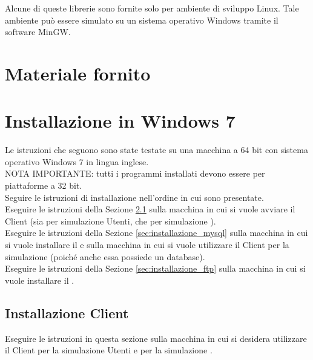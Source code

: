\documentclass[a4paper,twoside,10pt,openany]{scrbook}
\begin{document}
Alcune di queste librerie sono fornite solo per ambiente di sviluppo Linux. Tale ambiente può essere simulato su un sistema operativo Windows tramite il software MinGW.\\
%
%
\section{Materiale fornito}
%
\section{Installazione in Windows 7}
%
Le istruzioni che seguono sono state testate su una macchina a 64 bit con sistema operativo Windows 7 in lingua inglese.\\
NOTA IMPORTANTE: tutti i programmi installati devono essere per piattaforme a 32 bit.\\
Seguire le istruzioni di installazione nell'ordine in cui sono presentate.\\
Eseguire le istruzioni della Sezione \ref{sec:installazione_client} sulla macchina in cui si vuole avviare il Client (sia per simulazione Utenti, che per simulazione \auth).\\
Eseguire le istruzioni della Sezione \ref{sec:installazione_mysql} sulla macchina in cui si vuole installare il \sr e sulla macchina in cui si vuole utilizzare il Client per la simulazione \auth (poiché anche essa possiede un database).\\
Eseguire le istruzioni della Sezione \ref{sec:installazione_ftp} sulla macchina in cui si vuole installare il \sa.\\
%
\subsection{Installazione Client}\label{sec:installazione_client}
Eseguire le istruzioni in questa sezione sulla macchina in cui si desidera utilizzare il Client per la simulazione Utenti e per la simulazione \auth.
%
\end{document}
